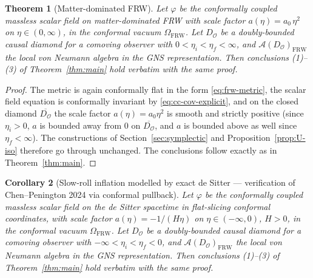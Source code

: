 \documentclass[11pt]{article}
\newtheorem{theorem}{Theorem}
\newtheorem{corollary}[theorem]{Corollary}
\theoremstyle{definition}
\renewcommand{\AA}{\mathcal{A}}
\newcommand{\OO}{\mathcal{O}}
\newcommand{\FRW}{\mathrm{FRW}}
\begin{document}
\begin{theorem}[Matter-dominated FRW]\label{thm:matter}
Let $\varphi$ be the conformally coupled massless scalar field on matter-dominated FRW with scale factor $a(\eta) = a_0\,\eta^2$ on $\eta\in(0,\infty)$, in the conformal vacuum $\Omega_\FRW$. Let $D_\OO$ be a doubly-bounded causal diamond for a comoving observer with $0<\eta_i<\eta_f<\infty$, and $\AA(D_\OO)_\FRW$ the local von Neumann algebra in the GNS representation. Then conclusions (1)--(3) of Theorem~\ref{thm:main} hold verbatim with the same proof.
\end{theorem}

\begin{proof}
The metric is again conformally flat in the form \eqref{eq:frw-metric}, the scalar field equation is conformally invariant by \eqref{eq:cc-cov-explicit}, and on the closed diamond $\overline{D_\OO}$ the scale factor $a(\eta)=a_0\eta^2$ is smooth and strictly positive (since $\eta_i > 0$, $a$ is bounded away from $0$ on $\overline{D_\OO}$, and $a$ is bounded above as well since $\eta_f < \infty$). The constructions of Section~\ref{sec:symplectic} and Proposition~\ref{prop:U-iso} therefore go through unchanged. The conclusions follow exactly as in Theorem~\ref{thm:main}.
\end{proof}

\begin{corollary}[Slow-roll inflation modelled by exact de Sitter — verification of Chen--Penington 2024 via conformal pullback]\label{thm:dS}
Let $\varphi$ be the conformally coupled massless scalar field on the de Sitter spacetime in flat-slicing conformal coordinates, with scale factor $a(\eta) = -1/(H\eta)$ on $\eta\in(-\infty,0)$, $H>0$, in the conformal vacuum $\Omega_\FRW$. Let $D_\OO$ be a doubly-bounded causal diamond for a comoving observer with $-\infty<\eta_i<\eta_f<0$, and $\AA(D_\OO)_\FRW$ the local von Neumann algebra in the GNS representation. Then conclusions (1)--(3) of Theorem~\ref{thm:main} hold verbatim with the same proof.
\end{corollary}
\end{document}
